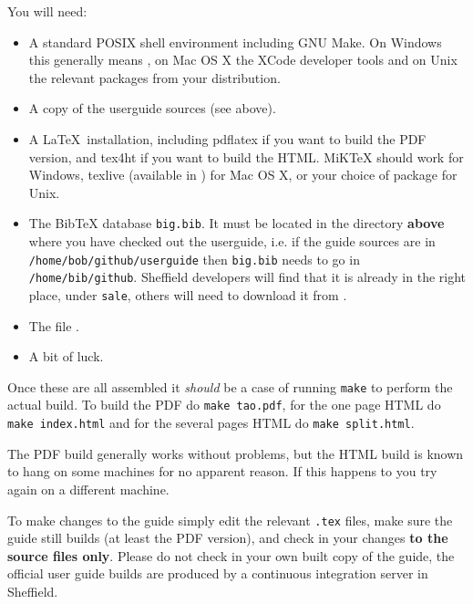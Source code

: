 You will need:
\begin{itemize}
\item
A standard POSIX shell environment including GNU Make.  On Windows this
generally means , on Mac OS X the XCode
developer tools and on Unix the relevant packages from your distribution.
\item
A copy of the userguide sources (see above).
\item
A \LaTeX\ installation, including pdflatex if you want to build the PDF
version, and tex4ht if you want to build the HTML.  MiKTeX should work for
Windows, texlive (available in ) for
Mac OS X, or your choice of package for Unix.
\item
The BibTeX database \texttt{big.bib}.  It must be located in the directory
\textbf{above} where you have checked out the userguide, i.e. if the guide
sources are in \verb|/home/bob/github/userguide| then \texttt{big.bib} needs to go
in \verb|/home/bib/github|.  Sheffield developers will find that it is already in
the right place, under \texttt{sale}, others will need to download it from
.
\item
The file .
\item
A bit of luck.
\end{itemize}

Once these are all assembled it \emph{should} be a case of running
\texttt{make} to perform the actual build.  To build the PDF do
\texttt{make tao.pdf}, for the one page HTML do \texttt{make index.html} and
for the several pages HTML do \texttt{make split.html}.

The PDF build generally works without problems, but the HTML build is known to
hang on some machines for no apparent reason.  If this happens to you try again
on a different machine.


To make changes to the guide simply edit the relevant \texttt{.tex} files, make
sure the guide still builds (at least the PDF version), and check in your
changes \textbf{to the source files only}.  Please do not check in your own
built copy of the guide, the official user guide builds are produced by a
continuous integration server in Sheffield.

